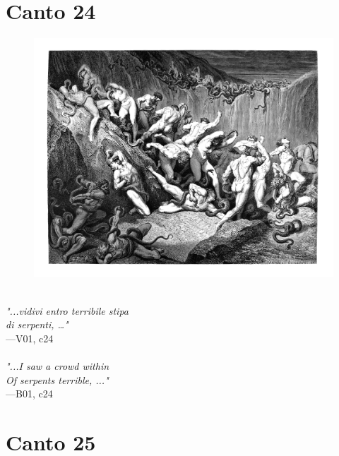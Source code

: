 \documentclass[../Dore_vision.tex]{subfiles}
\begin{document}
\newpage

\section{Canto 24}

\begin{figure}[ht]
\centering
\includegraphics[height=\figsize]{illustrations/book_1/V01, c24.jpg}
\end{figure}

\begin{center}
\begin{minipage}{0.8\linewidth}
\textit{\\
"...vidivi entro terribile stipa\\di serpenti, …"} \\
—V01, c24 \\~\\
\textit{"...I saw a crowd within\\Of serpents terrible, ..."} \\
—B01, c24
\end{minipage}
\end{center}

\newpage

\section{Canto 25}
\end{document}

